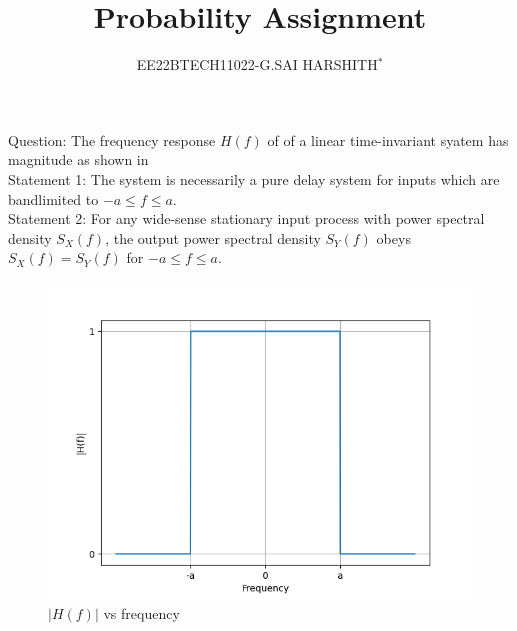 \documentclass[journal,12pt,twocolumn]{IEEEtran}
\theoremstyle{remark}
\begin{document}

\vspace{3cm}

\title{Probability Assignment}
\author{EE22BTECH11022-G.SAI HARSHITH$^{*}$%
}
\maketitle
\newpage
\bigskip
\renewcommand{\thefigure}{\theenumi}
\renewcommand{\thetable}{\theenumi}

Question: The frequency response $H(f)$ of of a linear time-invariant syatem has magnitude as shown in \\
Statement 1: The system is necessarily a pure delay system for inputs which are bandlimited to $-a \leq f \leq a$.\\
Statement 2: For any wide-sense stationary input process with power spectral density $S_X(f)$, the output power spectral density $S_Y(f)$ obeys $S_X(f)=S_Y(f)$ for $-a \leq f \leq a$.\\
\begin{figure}[!ht]
\centering
\includegraphics[width=\columnwidth]{figs/figure.png}
\caption{$|H(f)|$ vs frequency}
\label{fig:11}
\end{figure}\\
\solution
\end{document}
